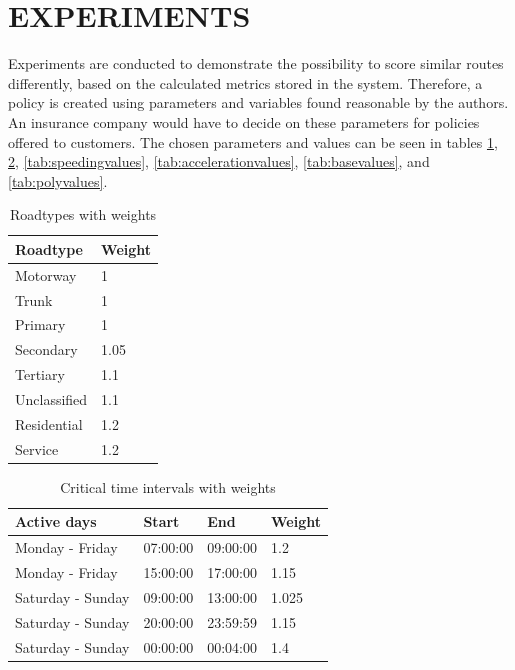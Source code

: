 \section{EXPERIMENTS}\label{sec:expe}
Experiments are conducted to demonstrate the possibility to score similar routes differently, based on the calculated metrics stored in the system. Therefore, a policy is created using parameters and variables found reasonable by the authors. An insurance company would have to decide on these parameters for policies offered to customers. The chosen parameters and values can be seen in tables \ref{tab:roadtypevalues}, \ref{tab:crittimevalues}, \ref{tab:speedingvalues}, \ref{tab:accelerationvalues}, \ref{tab:basevalues}, and \ref{tab:polyvalues}.

\begin{table}
    \centering
    \begin{tabular}{ll}
    \textbf{Roadtype} & \textbf{Weight} \\ \hline
    Motorway          & 1               \\
    Trunk             & 1               \\
    Primary           & 1               \\
    Secondary         & 1.05            \\
    Tertiary          & 1.1             \\
    Unclassified      & 1.1             \\
    Residential       & 1.2             \\
    Service           & 1.2             \\ \hline
    \end{tabular}
    \caption{Roadtypes with weights}
    \label{tab:roadtypevalues}
\end{table}

\begin{table}
    \centering
    \begin{tabular}{llll}
    \textbf{Active days} & \textbf{Start} & \textbf{End} & \textbf{Weight} \\ \hline
    Monday - Friday      & 07:00:00       & 09:00:00     & 1.2             \\
    Monday - Friday      & 15:00:00       & 17:00:00     & 1.15            \\
    Saturday - Sunday    & 09:00:00       & 13:00:00     & 1.025           \\
    Saturday - Sunday    & 20:00:00       & 23:59:59     & 1.15            \\
    Saturday - Sunday    & 00:00:00       & 00:04:00     & 1.4             \\ \hline
    \end{tabular}
    \caption{Critical time intervals with weights}
    \label{tab:crittimevalues}
\end{table}

